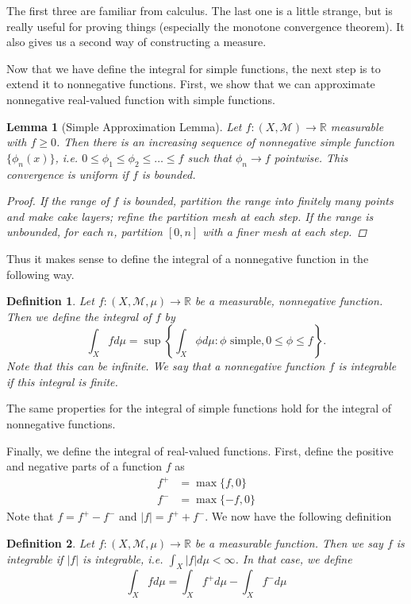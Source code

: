\documentclass[12pt]{amsart}         %
\newtheorem{definition}{Definition}[section]
\newtheorem{lemma}{Lemma}[section]
\theoremstyle{remark}
\newcommand{\R}{\mathbb{R}}
\begin{document}
The first three are familiar from calculus. The last one is a little strange, but is really useful for proving things (especially the monotone convergence theorem). It also gives us a second way of constructing a measure.

Now that we have define the integral for simple functions, the next step is to extend it to nonnegative functions. First, we show that we can approximate nonnegative real-valued function with simple functions.

\begin{lemma}[Simple Approximation Lemma]
Let $f: (X,\mathcal{M}) \rightarrow \R$ measurable with $f \geq 0$. Then there is an increasing sequence of nonnegative simple function $\{ \phi_n(x) \} $, i.e. $0 \leq \phi_1 \leq \phi_2 \leq \dots \leq f$ such that $\phi_n \rightarrow f$ pointwise. This convergence is uniform if $f$ is bounded.
\begin{proof}
If the range of $f$ is bounded, partition the range into finitely many points and make cake layers; refine the partition mesh at each step. If the range is unbounded, for each $n$, partition $[0, n]$ with a finer mesh at each step.
\end{proof}
\end{lemma}

Thus it makes sense to define the integral of a nonnegative function in the following way.

\begin{definition}
Let $f:(X, \mathcal{M}, \mu) \rightarrow \R$ be a measurable, nonnegative function. Then we define the integral of $f$ by
\[
\int_X fd\mu =\sup\left\{ \int_X \phi d\mu : \phi \text{  simple}, 0\leq\phi\leq f \right\}.
\]
Note that this can be infinite. We say that a nonnegative function $f$ is integrable if this integral is finite.
\end{definition}
The same properties for the integral of simple functions hold for the integral of nonnegative functions.

Finally, we define the integral of real-valued functions. First, define the positive and negative parts of a function $f$ as 
\begin{align*}
f^+ &= \max\{f,0\} \\
f^- &= \max\{-f,0\}
\end{align*}
Note that $f = f^+ - f^-$ and $|f| = f^+ + f^-$. We now have the following definition 

\begin{definition}
Let $f:(X, \mathcal{M}, \mu) \rightarrow \R$ be a measurable function. Then we say $f$ is integrable if $|f|$ is integrable, i.e. $\int_X |f| d\mu < \infty$. In that case, we define
\[
\int_X f d\mu=\int_Xf^{+}d\mu-\int_Xf^-d\mu
\]
\end{definition}
\end{document}
